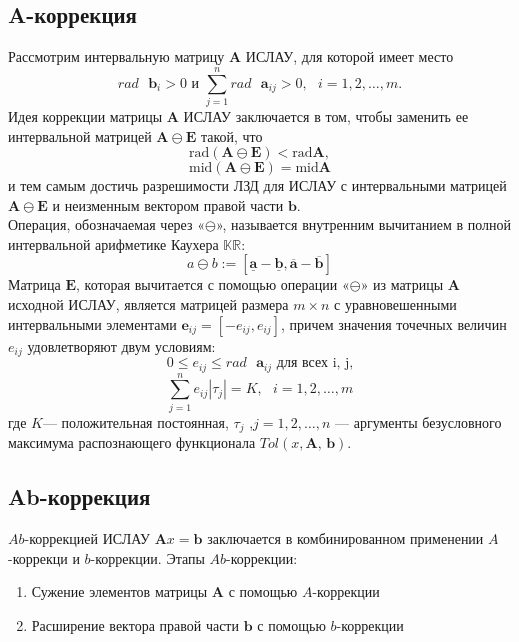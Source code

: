 \documentclass[a4paper,12pt]{article}
\begin{document}
\subsection{A-коррекция}
Рассмотрим интервальную матрицу \textbf{A} ИСЛАУ, для которой имеет место
\begin{equation*}
    rad \text{ }\mathbf{b}_i>0 \text{ и } \sum_{j=1}^{n}rad\text{ }\mathbf{a}_{ij}>0,\text{ }i=1,2,\dots,m.
\end{equation*}
Идея коррекции матрицы \textbf{A} ИСЛАУ заключается в том, чтобы заменить ее интервальной матрицей
  \( \mathbf{A} \ominus \mathbf{E} \) такой, что
  \[
    \text{rad} (\mathbf{A} \ominus \mathbf{E}) < \text{rad} \mathbf{A}, \]
   \[\text{mid} (\mathbf{A} \ominus \mathbf{E}) = \text{mid} \mathbf{A} \]
и тем самым достичь разрешимости ЛЗД для ИСЛАУ с интервальными
матрицей \( \mathbf{A} \ominus \mathbf{E} \) и неизменным вектором правой части $\mathbf{b}$.\\
Операция, обозначаемая через «$\ominus$», называется внутренним вычитанием в полной интервальной арифметике Каухера $\mathbb{KR}$:
\begin{equation*}
    a \ominus b:=[\underline{\mathbf{a}}-\underline{\mathbf{b}},\overline{\mathbf{a}}-\overline{\mathbf{b}}]
\end{equation*}
Матрица $\mathbf{E}$, которая вычитается с помощью операции «$\ominus$» из матрицы $\mathbf{A}$ исходной ИСЛАУ, является матрицей размера $m \times n$ с уравновешенными интервальными элементами $\mathbf{e}_{ij} = [-e_{ij}, e_{ij}]$, причем значения точечных величин $e_{ij}$ удовлетворяют двум условиям:
  \[
    0 \leq e_{ij} \leq rad \text{ }\mathbf{a}_{ij} \text{ для всех i, j,} \]
   \[\sum_{j=1}^{n}e_{ij}|\tau_j|=K, \text{ }i=1,2,\dots,m \]
где $K$— положительная постоянная, $\tau_j$ ,$j=1,2,\dots,n$ — аргументы безусловного максимума распознающего функционала $Tol(x,\textbf{A, b})$.

\subsection{Ab-коррекция}
\( Ab \)-коррекцией ИСЛАУ \( \mathbf{A}x = \mathbf{b} \) заключается
  в комбинированном применении \( A \)-коррекци и \( b \)-коррекции.
  Этапы $Ab$-коррекции:
  \begin{enumerate}
      \item Сужение элементов матрицы \( \mathbf{A} \) с помощью $A$-коррекции
      \item Расширение вектора правой части \( \mathbf{b} \) с помощью $b$-коррекции
  \end{enumerate}
\end{document}
